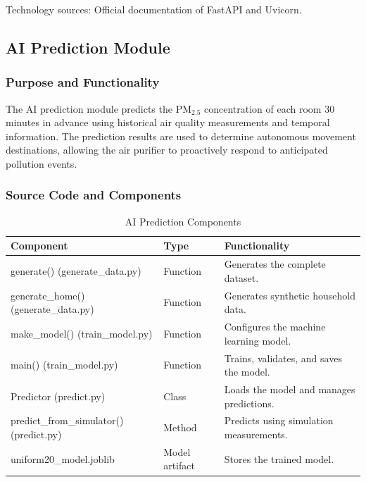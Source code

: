 \documentclass[conference]{IEEEtran}
\newlength{\tablebodywidth}
\newcommand{\pmfine}{\ensuremath{\mathrm{PM}_{2.5}}}
\begin{document}
Technology sources: Official documentation of FastAPI and Uvicorn.

\subsection{AI Prediction Module \cite{ref6,ref13}}

\subsubsection{Purpose and Functionality}

The AI prediction module predicts the \pmfine{} concentration of each room 30 minutes in advance using historical air quality measurements and temporal information. The prediction results are used to determine autonomous movement destinations, allowing the air purifier to proactively respond to anticipated pollution events.

\subsubsection{Source Code and Components}

\begin{table}[!t]
\caption{AI Prediction Components}
\label{tab:t9}
\centering\footnotesize
\setlength{\tabcolsep}{3pt}
\setlength{\tablebodywidth}{\dimexpr\columnwidth-18pt\relax}
\begin{tabular}{>{\raggedright\arraybackslash}p{0.370\tablebodywidth}>{\raggedright\arraybackslash}p{0.200\tablebodywidth}>{\raggedright\arraybackslash}p{0.430\tablebodywidth}}
\toprule
\textbf{Component} & \textbf{Type} & \textbf{Functionality} \\
\midrule
generate() (generate\_\allowbreak{}data.py) & Function & Generates the complete dataset. \\
generate\_\allowbreak{}home() (generate\_\allowbreak{}data.py) & Function & Generates synthetic household data. \\
make\_\allowbreak{}model() (train\_\allowbreak{}model.py) & Function & Configures the machine learning model. \\
main() (train\_\allowbreak{}model.py) & Function & Trains, validates, and saves the model. \\
Predictor (predict.py) & Class & Loads the model and manages predictions. \\
predict\_\allowbreak{}from\_\allowbreak{}simulator() (predict.py) & Method & Predicts using simulation measurements. \\
uniform20\_\allowbreak{}model.joblib & Model artifact & Stores the trained model. \\
\bottomrule
\end{tabular}
\end{table}
\end{document}
